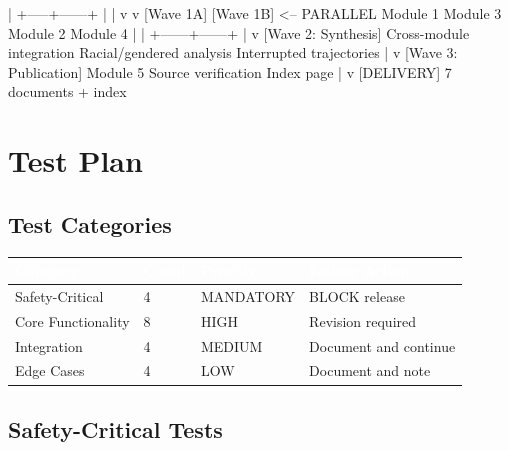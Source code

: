 \documentclass[11pt,letterpaper]{article}
\newcommand{\tableheader}[1]{\textbf{\sffamily\textcolor{white}{#1}}}
\begin{document}
\begin{asciibox}
    |
    +-----+------+
    |             |
    v             v
[Wave 1A]      [Wave 1B]     <-- PARALLEL
Module 1       Module 3
Module 2       Module 4
    |             |
    +------+------+
           |
           v
    [Wave 2: Synthesis]
    Cross-module integration
    Racial/gendered analysis
    Interrupted trajectories
           |
           v
    [Wave 3: Publication]
    Module 5
    Source verification
    Index page
           |
           v
    [DELIVERY]
    7 documents + index
\end{asciibox}

\section{Test Plan}

\subsection{Test Categories}

\begin{center}
\begin{tabularx}{\textwidth}{L{3cm}C{1.5cm}C{2cm}X}
\toprule
{}
\tableheader{Category} & \tableheader{Count} & \tableheader{Priority} & \tableheader{Failure Action} \\
\midrule
Safety-Critical & 4 & MANDATORY & BLOCK release \\
Core Functionality & 8 & HIGH & Revision required \\
Integration & 4 & MEDIUM & Document and continue \\
Edge Cases & 4 & LOW & Document and note \\
\bottomrule
\end{tabularx}
\end{center}

\subsection{Safety-Critical Tests}
\end{document}

